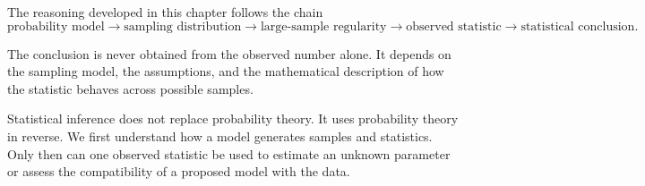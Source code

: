 The reasoning developed in this chapter follows the chain
\[
\text{probability model}
\longrightarrow
\text{sampling distribution}
\longrightarrow
\text{large-sample regularity}
\longrightarrow
\text{observed statistic}
\longrightarrow
\text{statistical conclusion}.
\]

The conclusion is never obtained from the observed number alone. It depends on
the sampling model, the assumptions, and the mathematical description of how the
statistic behaves across possible samples.

\begin{summarybox}
Statistical inference does not replace probability theory. It uses probability
theory in reverse. We first understand how a model generates samples and
statistics. Only then can one observed statistic be used to estimate an unknown
parameter or assess the compatibility of a proposed model with the data.
\end{summarybox}
